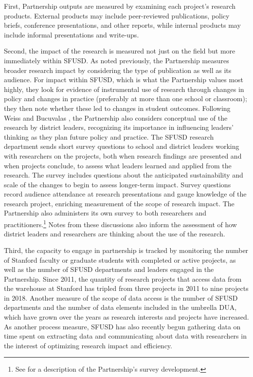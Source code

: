 \documentclass[
]{WileySix}
\begin{document}
First, Partnership outputs are measured by examining each project's research products. External products may include peer-reviewed publications, policy briefs, conference presentations, and other reports, while internal products may include informal presentations and write-ups.

Second, the impact of the research is measured not just on the field but more immediately within SFUSD. As noted previously, the Partnership measures broader research impact by considering the type of publication as well as its audience. For impact within SFUSD, which is what the Partnership values most highly, they look for evidence of instrumental use of research through changes in policy and changes in practice (preferably at more than one school or classroom); they then note whether these led to changes in student outcomes. Following Weiss and Bucuvalas \citeyearpar{weiss1980}, the Partnership also considers conceptual use of the research by district leaders, recognizing its importance in influencing leaders' thinking as they plan future policy and practice. The SFUSD research department sends short survey questions to school and district leaders working with researchers on the projects, both when research findings are presented and when projects conclude, to assess what leaders learned and applied from the research. The survey includes questions about the anticipated sustainability and scale of the changes to begin to assess longer-term impact. Survey questions record audience attendance at research presentations and gauge knowledge of the research project, enriching measurement of the scope of research impact. The Partnership also administers its own survey to both researchers and practitioners.\footnote{See \citet{wentworth2017} for a description of the Partnership's survey development.} Notes from these discussions also inform the assessment of how district leaders and researchers are thinking about the use of the research.

Third, the capacity to engage in partnership is tracked by monitoring the number of Stanford faculty or graduate students with completed or active projects, as well as the number of SFUSD departments and leaders engaged in the Partnership. Since 2011, the quantity of research projects that access data from the warehouse at Stanford has tripled from three projects in 2011 to nine projects in 2018. Another measure of the scope of data access is the number of SFUSD departments and the number of data elements included in the umbrella DUA, which have grown over the years as research interests and projects have increased. As another process measure, SFUSD has also recently begun gathering data on time spent on extracting data and communicating about data with researchers in the interest of optimizing research impact and efficiency.
\end{document}
